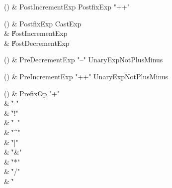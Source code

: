 \begin{bbgrammarappendix}

() & PostIncrementExp \label{prod:PostIncrementExp}  \: PostfixExp \xcd"++"  \\


\end{bbgrammarappendix}

\begin{bbgrammarappendix}

() & PostfixExp \label{prod:PostfixExp}  \: CastExp  \\

 &    \| PostIncrementExp \\
 &    \| PostDecrementExp \\

\end{bbgrammarappendix}

\begin{bbgrammarappendix}

() & PreDecrementExp \label{prod:PreDecrementExp}  \: \xcd"--" UnaryExpNotPlusMinus  \\


\end{bbgrammarappendix}

\begin{bbgrammarappendix}

() & PreIncrementExp \label{prod:PreIncrementExp}  \: \xcd"++" UnaryExpNotPlusMinus  \\


\end{bbgrammarappendix}

\begin{bbgrammarappendix}

() & PrefixOp \label{prod:PrefixOp}  \: \xcd"+"  \\

 &    \| \xcd"-" \\
 &    \| \xcd"!" \\
 &    \| \xcd"~" \\
 &    \| \xcd"^" \\
 &    \| \xcd"|" \\
 &    \| \xcd"&" \\
 &    \| \xcd"*" \\
 &    \| \xcd"/" \\
 &    \| \xcd"%

\end{bbgrammarappendix}

